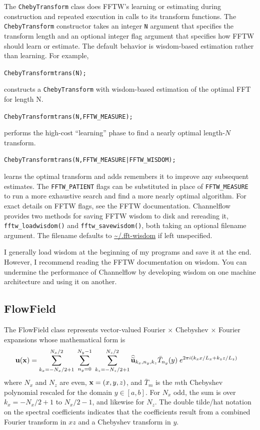 \documentclass{article}[12pt]
\begin{document}
The {\tt ChebyTransform} class does FFTW's learning or estimating during
construction and repeated execution in calls to its transform functions.
The {\tt ChebyTransform} constructor takes an integer {\tt N} argument
that specifies the transform length and an optional integer flag argument
that specifies how FFTW should learn or estimate. The default behavior
is wisdom-based estimation rather than learning. For example,
\begin{alltt}
  ChebyTransform trans(N);
\end{alltt}
constructs a {\tt ChebyTransform} with wisdom-based estimation of the
optimal FFT for length N.
\begin{alltt}
  ChebyTransform trans(N, FFTW_MEASURE);
\end{alltt}
performs the high-cost ``learning'' phase to find a nearly optimal
length-$N$ transform.
\begin{alltt}
  ChebyTransform trans(N, FFTW_MEASURE | FFTW_WISDOM);
\end{alltt}
learns the optimal transform and adds remembers it to improve any subsequent
estimates. The {\tt FFTW\_PATIENT} flags can be substituted in place of
{\tt FFTW\_MEASURE} to run a more exhaustive search and find a more nearly
optimal algorithm. For exact details on FFTW flags, see the FFTW documentation.
Channelflow provides two methods for saving FFTW wisdom to disk and
rereading it, {\tt fftw\_loadwisdom()} and {\tt fftw\_savewisdom()}, both
taking an optional filename argument. The filename defaults to
\url{~/.fft-wisdom} if left unspecified.

I generally load wisdom at the beginning of my programs and save it at
the end. However, I recommend reading the FFTW documentation on
wisdom. You can undermine the performance of Channelflow by developing
wisdom on one machine architecture and using it on another.

\subsection{FlowField}
\label{sec:flowfield}



The FlowField class represents vector-valued Fourier $\times$ Chebyshev
$\times$ Fourier expansions whose mathematical form is
\begin{align}
{\bf u}({\bf x}) &= \sum_{k_x=-N_x/2+1}^{N_x/2} \; \sum_{n_y=0}^{N_y-1} \; \sum_{k_z=-N_z/2+1}^{N_z/2}
\widehat{\widetilde{{\bf u}}}_{k_x,n_y,k_z} \bar{T}_{n_y}(y) \; e^{2 \pi i \left(k_x x/L_x + k_z z/L_z \right)}
\label{eqn:flowfield_expansion_math}
\end{align}
where $N_x$ and $N_z$ are even, ${\bf x} = (x,y,z)$, and $\bar{T}_m$ is
the $m$th Chebyshev polynomial rescaled for the domain $y \in [a,b]$.
For $N_x$ odd, the sum is over $k_x = -N_x/2+1$ to $N_x/2-1$, and
likewise for $N_z$. The double tilde/hat notation on the spectral
coefficients indicates that the coefficients result from a combined
Fourier transform in $xz$ and a Chebyshev transform in $y$.
\end{document}
